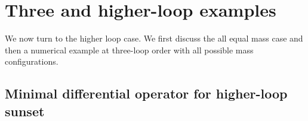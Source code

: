 \documentclass[a4paper,12pt]{article}
\numberwithin{equation}{section}
\numberwithin{figure}{section}
\begin{document}
\section{Three and higher-loop examples}\label{sec:higherloop}

We now turn to the higher loop case. We first discuss the all equal
mass case and then a numerical example at three-loop order with all
possible mass configurations.

\subsection{Minimal differential operator for higher-loop sunset}
\end{document}
